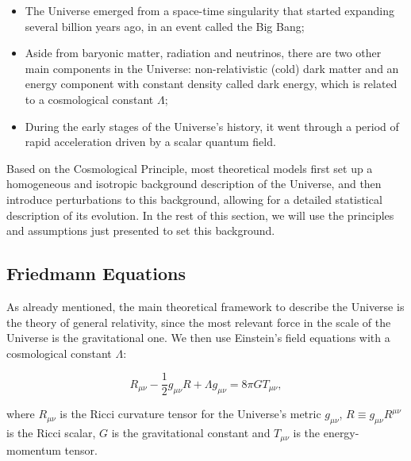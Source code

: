 \documentclass[openany,a4paper,12pt,oneside]{book}
\begin{document}
\begin{spacing}{1.5}
\begin{itemize}
    \item The Universe emerged from a space-time singularity that started expanding several billion years ago, in an event called the Big Bang;
    \item Aside from baryonic matter, radiation and neutrinos, there are two other main components in the Universe: non-relativistic (cold) dark matter and an energy component with constant density called dark energy, which is related to a cosmological constant $\Lambda$;
    \item During the early stages of the Universe's history, it went through a period of rapid acceleration driven by a scalar quantum field.
\end{itemize}


Based on the Cosmological Principle, most theoretical models first set up a homogeneous and isotropic background description of the Universe, and then introduce perturbations to this background, allowing for a detailed statistical description of its evolution. In the rest of this section, we will use the principles and assumptions just presented to set this background.

\subsection{Friedmann Equations}

As already mentioned, the main theoretical framework to describe the Universe is the theory of general relativity, since the most relevant force in the scale of the Universe is the gravitational one. We then use Einstein's field equations with a cosmological constant $\Lambda$:

\begin{equation}\label{field_eqs}
    R_{\mu\nu}-\frac{1}{2}g_{\mu\nu}R+\Lambda g_{\mu\nu}=8\pi GT_{\mu\nu},
\end{equation}

\noindent where $R_{\mu\nu}$ is the Ricci curvature tensor for the Universe's metric $g_{\mu\nu}$, $R\equiv g_{\mu\nu} R^{\mu\nu}$ is the Ricci scalar, $G$ is the gravitational constant and $T_{\mu\nu}$ is the energy-momentum tensor. 


\end{spacing}
\end{document}
